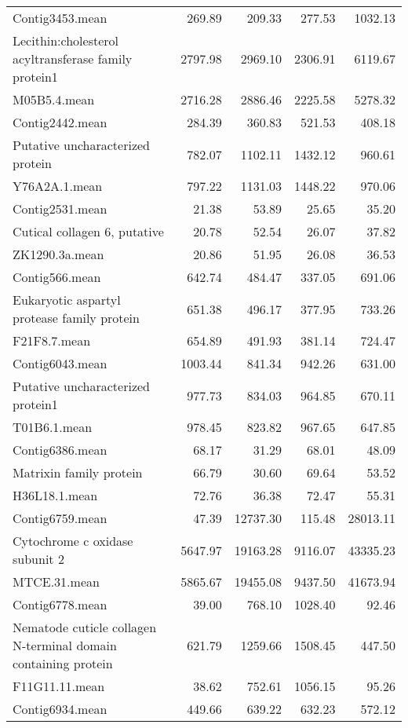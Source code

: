 \begin{longtable}{p{7cm}rrrr}
   \hline
Contig3453.mean & 269.89 & 209.33 & 277.53 & 1032.13 \\ 
  Lecithin:cholesterol acyltransferase family protein1 & 2797.98 & 2969.10 & 2306.91 & 6119.67 \\ 
  M05B5.4.mean & 2716.28 & 2886.46 & 2225.58 & 5278.32 \\ 
  \hline
Contig2442.mean & 284.39 & 360.83 & 521.53 & 408.18 \\ 
  Putative uncharacterized protein & 782.07 & 1102.11 & 1432.12 & 960.61 \\ 
  Y76A2A.1.mean & 797.22 & 1131.03 & 1448.22 & 970.06 \\ 
   \hline
Contig2531.mean & 21.38 & 53.89 & 25.65 & 35.20 \\ 
  Cutical collagen 6, putative & 20.78 & 52.54 & 26.07 & 37.82 \\ 
  ZK1290.3a.mean & 20.86 & 51.95 & 26.08 & 36.53 \\ 
   \hline
Contig566.mean & 642.74 & 484.47 & 337.05 & 691.06 \\ 
  Eukaryotic aspartyl protease family protein & 651.38 & 496.17 & 377.95 & 733.26 \\ 
  F21F8.7.mean & 654.89 & 491.93 & 381.14 & 724.47 \\ 
   \hline
Contig6043.mean & 1003.44 & 841.34 & 942.26 & 631.00 \\ 
  Putative uncharacterized protein1 & 977.73 & 834.03 & 964.85 & 670.11 \\ 
  T01B6.1.mean & 978.45 & 823.82 & 967.65 & 647.85 \\ 
   \hline
Contig6386.mean & 68.17 & 31.29 & 68.01 & 48.09 \\ 
  Matrixin family protein & 66.79 & 30.60 & 69.64 & 53.52 \\ 
  H36L18.1.mean & 72.76 & 36.38 & 72.47 & 55.31 \\ 
   \hline
Contig6759.mean & 47.39 & 12737.30 & 115.48 & 28013.11 \\ 
  Cytochrome c oxidase subunit 2 & 5647.97 & 19163.28 & 9116.07 & 43335.23 \\ 
  MTCE.31.mean & 5865.67 & 19455.08 & 9437.50 & 41673.94 \\ 
   \hline
Contig6778.mean & 39.00 & 768.10 & 1028.40 & 92.46 \\ 
  Nematode cuticle collagen N-terminal domain containing protein & 621.79 & 1259.66 & 1508.45 & 447.50 \\ 
  F11G11.11.mean & 38.62 & 752.61 & 1056.15 & 95.26 \\ 
   \hline
Contig6934.mean & 449.66 & 639.22 & 632.23 & 572.12 \\ 

\end{longtable}
